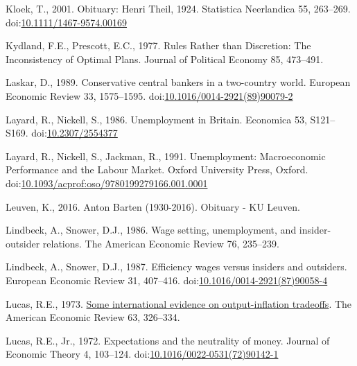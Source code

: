 \documentclass[
  12pt,
  onecolumn]{article}
\newlength{\cslhangindent}
\newlength{\cslentryspacingunit} %
\newenvironment{CSLReferences}[2] %
 {%
  \setlength{\parindent}{0pt}
  \ifodd #1
  \let\oldpar\par
  \def\par{\hangindent=\cslhangindent\oldpar}
  \fi
  \setlength{\parskip}{#2\cslentryspacingunit}
 }%
 {}
\begin{document}
\begin{CSLReferences}{1}{0}
\leavevmode{}%
Kloek, T., 2001. Obituary: {Henri Theil}, 1924. Statistica Neerlandica 55, 263--269. doi:\href{https://doi.org/10.1111/1467-9574.00169}{10.1111/1467-9574.00169}

\leavevmode{}%
Kydland, F.E., Prescott, E.C., 1977. Rules {Rather} than {Discretion}: {The Inconsistency} of {Optimal Plans}. Journal of Political Economy 85, 473--491.

\leavevmode{}%
Laskar, D., 1989. Conservative central bankers in a two-country world. European Economic Review 33, 1575--1595. doi:\href{https://doi.org/10.1016/0014-2921(89)90079-2}{10.1016/0014-2921(89)90079-2}

\leavevmode{}%
Layard, R., Nickell, S., 1986. Unemployment in {Britain}. Economica 53, S121--S169. doi:\href{https://doi.org/10.2307/2554377}{10.2307/2554377}

\leavevmode{}%
Layard, R., Nickell, S., Jackman, R., 1991. Unemployment: {Macroeconomic Performance} and the {Labour Market}. {Oxford University Press}, {Oxford}. doi:\href{https://doi.org/10.1093/acprof:oso/9780199279166.001.0001}{10.1093/acprof:oso/9780199279166.001.0001}

\leavevmode{}%
Leuven, K., 2016. Anton {Barten} (1930-2016). Obituary - KU Leuven.

\leavevmode{}%
Lindbeck, A., Snower, D.J., 1986. Wage setting, unemployment, and insider-outsider relations. The American Economic Review 76, 235--239.

\leavevmode{}%
Lindbeck, A., Snower, D.J., 1987. Efficiency wages versus insiders and outsiders. European Economic Review 31, 407--416. doi:\href{https://doi.org/10.1016/0014-2921(87)90058-4}{10.1016/0014-2921(87)90058-4}

\leavevmode{}%
Lucas, R.E., 1973. \href{http://www.jstor.org/stable/1914364}{Some international evidence on output-inflation tradeoffs}. The American Economic Review 63, 326--334.

\leavevmode{}%
Lucas, R.E., Jr., 1972. Expectations and the neutrality of money. Journal of Economic Theory 4, 103--124. doi:\href{https://doi.org/10.1016/0022-0531(72)90142-1}{10.1016/0022-0531(72)90142-1}


\end{CSLReferences}
\end{document}
